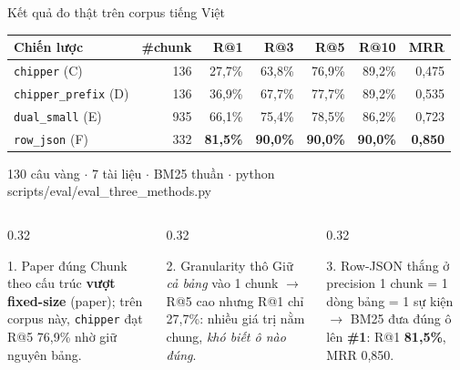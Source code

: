 \documentclass[aspectratio=169,11pt]{beamer}
\newcommand{\src}[1]{{\footnotesize\ttfamily #1}}
\begin{document}
\begin{frame}{Kết quả đo thật trên corpus tiếng Việt}
  \centering
  \footnotesize
  \begin{tabular}{@{}l rrrrrr@{}}
    \toprule
    \textbf{Chiến lược} & \textbf{\#chunk} & \textbf{R@1} & \textbf{R@3} & \textbf{R@5} & \textbf{R@10} & \textbf{MRR} \\
    \midrule
    \texttt{chipper} (C)        & 136 & 27,7\% & 63,8\% & 76,9\% & 89,2\% & 0,475 \\
    \texttt{chipper\_prefix} (D) & 136 & 36,9\% & 67,7\% & 77,7\% & 89,2\% & 0,535 \\
    \texttt{dual\_small} (E)    & 935 & 66,1\% & 75,4\% & 78,5\% & 86,2\% & 0,723 \\
    \texttt{row\_json} (F)      & 332 & \textbf{81,5\%} & \textbf{90,0\%} & \textbf{90,0\%} & \textbf{90,0\%} & \textbf{0,850} \\
    \bottomrule
  \end{tabular}
  \vspace{0.4em}
  {\footnotesize 130 câu vàng $\cdot$ 7 tài liệu $\cdot$ BM25 thuần $\cdot$
  \src{python scripts/eval/eval\_three\_methods.py}}
  \vspace{0.5em}

  \begin{columns}[T]
    \begin{column}{0.32\textwidth}
      \begin{block}{\small 1. Paper đúng}
        Chunk theo cấu trúc \textbf{vượt fixed-size} (paper); trên corpus này,
        \texttt{chipper} đạt R@5 76,9\% nhờ giữ nguyên bảng.
      \end{block}
    \end{column}
    \begin{column}{0.32\textwidth}
      \begin{block}{\small 2. Granularity thô}
        Giữ \emph{cả bảng} vào 1 chunk $\rightarrow$ R@5 cao nhưng R@1 chỉ 27,7\%:
        nhiều giá trị nằm chung, \emph{khó biết ô nào đúng}.
      \end{block}
    \end{column}
    \begin{column}{0.32\textwidth}
      \begin{block}{\small 3. Row-JSON thắng ở precision}
        1 chunk = 1 dòng bảng = 1 sự kiện $\rightarrow$ BM25 đưa đúng ô lên
        \textbf{\#1}: R@1 \textbf{81,5\%}, MRR 0,850.
      \end{block}
    \end{column}
  \end{columns}
\end{frame}
\end{document}
